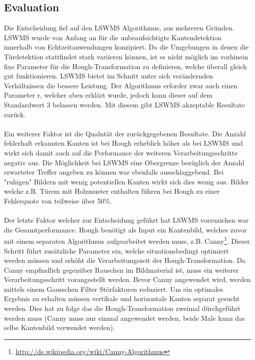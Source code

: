 \subsection{Evaluation}

Die Entscheidung fiel auf den LSWMS Algorithmus, aus mehreren Gründen. LSWMS wurde von Anfang an für die unbeaufsichtigte Kantendetektion innerhalb von Echtzeitanwendungen konzipiert. Da die Umgebungen in denen die Türdetektion stattfindet stark variieren können, ist es nicht möglich im vorhinein fixe Parameter für die Hough-Transformation zu definieren, welche überall gleich gut funktionieren. LSWMS bietet im Schnitt unter sich verändernden Verhältnissen die bessere Leistung. Der Algorithmus erforder zwar auch einen Parameter r, welcher oben erklärt wurde, jedoch kann dieser auf dem Standardwert 3 belassen werden. Mit diesem gibt LSWMS akzeptable Resultate zurück.
\paragraph{}
Ein weiterer Faktor ist die Qualutät der zurückgegebenen Resultate. Die Anzahl fehlerhaft erkannten Kanten ist bei Hough erheblich höher als bei LSWMS und wirkt sich damit auch auf die Performance der weiteren Verarbeitungsschritte negativ aus. Die Möglichkeit bei LSWMS eine Obergrenze bezüglich der Anzahl erwarteter Treffer angeben zu können war ebenfalls ausschlaggebend. Bei "ruhigen" Bildern mit wenig potentiellen Kanten wirkt sich dies wenig aus. Bilder welche z.B. Türem mit Holzmuster enthalten führen bei Hough zu einer Fehlerquote von teilweise über 50\%.
\paragraph{}
Der letzte Faktor welcher zur Entscheidung geführt hat LSWMS vorzuziehen war die Gesamtperformance. Hough benötigt als Input ein Kantenbild, welches zuvor mit einem separaten Algorithmus aufgearbeitet werden muss, z.B. Canny\footnote{\protect\url{http://de.wikipedia.org/wiki/Canny-Algorithmus}}. Dieser Schritt führt zusätzliche Parameter ein, welche situationsbedingt optimiert werden müssen und erhöht die Verarbeitungszeit der Hough-Transformation. Da Canny empfindlich gegenüber Rauschen im Bildmaterial ist, muss ein weiterer Verarbeitungsschritt vorangestellt werden. Bevor Canny angewendet wird, werden mittels einem Gausschen Filter Störfaktoren reduziert. Um ein optimales Ergebnis zu erhalten müssen vertikale und horizontale Kanten separat gesucht werden. Dies hat zu folge das die Hough-Transformation zweimal dürchgeführt werden muss (Canny muss nur einmal angewendet werden, beide Male kann das selbe Kantenbild verwendet werden).
